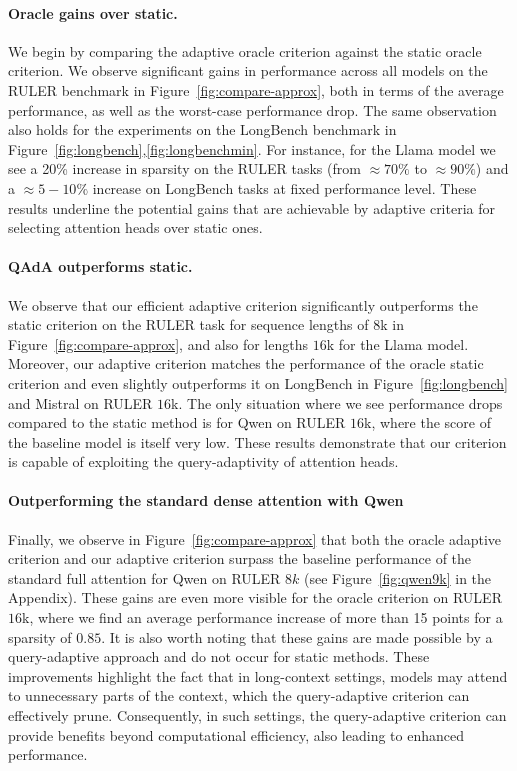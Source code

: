 \paragraph{Oracle gains over static.} We begin by comparing the adaptive oracle criterion against the  static oracle criterion. We observe significant gains in performance across all models on the RULER benchmark in Figure~\ref{fig:compare-approx}, both in terms of the average performance, as well as the worst-case performance drop. The same observation also holds for the experiments on the LongBench benchmark in  Figure~\ref{fig:longbench},\ref{fig:longbenchmin}. For instance, for the Llama model we see a 20\% increase in sparsity on the RULER tasks (from $\approx 70\%$ to $\approx 90\%$) and a $\approx 5-10\%$ increase on LongBench tasks at fixed performance level. These results underline the potential gains that are achievable by adaptive criteria for selecting attention heads over static ones.  



\paragraph{QAdA outperforms static.}
We observe that our efficient adaptive criterion significantly outperforms the static criterion  on the RULER task for sequence lengths of $8$k in Figure~\ref{fig:compare-approx}, and also for lengths $16$k for the Llama model. 
Moreover, our adaptive criterion matches the performance of the oracle static criterion and even slightly outperforms it on LongBench in Figure~\ref{fig:longbench} and Mistral on RULER $16$k. The only situation where we see performance drops compared to the static method is for Qwen on RULER $16$k, where the score of the baseline model is itself very low. These results demonstrate that our criterion is capable of exploiting the query-adaptivity of attention heads. 



\paragraph{Outperforming the standard dense attention with Qwen} Finally, we observe in Figure~\ref{fig:compare-approx} that both the oracle adaptive criterion and our adaptive criterion surpass the baseline performance of the standard full attention for Qwen on RULER $8k$ (see Figure~\ref{fig:qwen9k} in the Appendix).
These gains are even more visible for the oracle criterion on RULER $16$k, where we find an average performance increase of more than 15 points for a sparsity of $0.85$.  
It is also worth noting that these gains are made possible by a query-adaptive approach and do not occur for static methods. These improvements highlight the fact that in long-context settings, models may attend to unnecessary parts of the context, which the query-adaptive criterion can effectively prune. Consequently, in such settings, the query-adaptive criterion can provide benefits beyond computational efficiency, also leading to enhanced performance.




